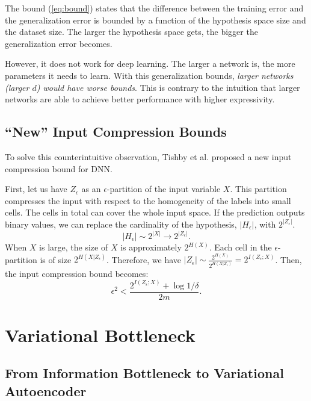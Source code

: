 \documentclass[11pt]{article}
\begin{document}
The bound (\ref{eq:bound}) states that the difference between the training error and the generalization error is bounded by a function of the hypothesis space size and the dataset size. The larger the hypothesis space gets, the bigger the generalization error becomes.

However, it does not work for deep learning. The larger a network is, the more parameters it needs to learn. With this generalization bounds, \emph{larger networks (larger $d$) would have worse bounds}. This is contrary to the intuition that larger networks are able to achieve better performance with higher expressivity.

\subsection*{``New'' Input Compression Bounds}

To solve this counterintuitive observation, Tishby et al. proposed a new input compression bound for DNN.

First, let us have $Z_\epsilon$ as an $\epsilon$-partition of the input variable $X$. This partition compresses the input with respect to the homogeneity of the labels into small cells. The cells in total can cover the whole input space. If the prediction outputs binary values, we can replace the cardinality of the hypothesis, $\vert H_\epsilon\vert$, with $2^{\vert Z_\epsilon\vert}$.
\begin{equation}
\vert H_\epsilon\vert \sim 2^{\vert X \vert} \rightarrow 2^{\vert Z_\epsilon\vert}.
\end{equation}
When $X$ is large, the size of $X$ is approximately $2^{H(X)}$. Each cell in the $\epsilon$-partition is of size $2^{H(X\vert Z_\epsilon)}$. Therefore, we have $\vert Z_\epsilon\vert\sim \frac{2^{H(X)}}{2^{H(X\vert Z_\epsilon)}} = 2^{I(Z_\epsilon;X)}$. Then, the input compression bound becomes:
\begin{equation}
\epsilon^2 < \frac{2^{I(Z_\epsilon;X)}+\log 1/\delta}{2m}.
\end{equation}

\section{Variational Bottleneck}

\subsection*{From Information Bottleneck to Variational Autoencoder}
\end{document}
